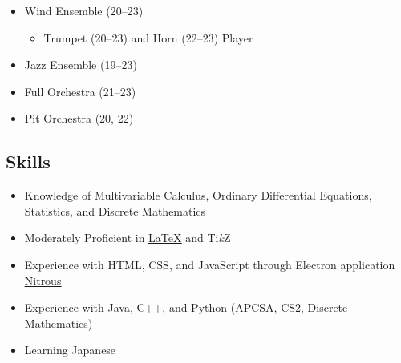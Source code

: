 \documentclass[12pt, twocolumn]{article}
\begin{document}
{\begin{itemize}
\begin{itemize}[leftmargin = 13.5pt]
\begin{itemize}[leftmargin = 13.5pt]
									\end{itemize}
								\item
									Wind Ensemble (20--23)
									\begin{itemize}[leftmargin = 13.5pt]
										\item
											Trumpet (20--23) and Horn (22--23) Player
									\end{itemize}
								\item
									Jazz Ensemble (19--23)
								\item
									Full Orchestra (21--23)
								\item
									Pit Orchestra (20, 22)
							\end{itemize}
					\end{itemize}
			\subsection*{Skills}
				\begin{itemize}
					\item
						Knowledge of Multivariable Calculus, Ordinary Differential Equations, Statistics, and Discrete Mathematics
					\item
						Moderately Proficient in \href{https://github.com/Endolite/TeX}{\underline{\LaTeX}} and Ti\textit{k}Z
					\item
						Experience with HTML, CSS, and JavaScript through Electron application \href{https://github.com/Endolite/Nitrous}{\underline{Nitrous}}
					\item
						Experience with Java, C++, and Python (APCSA, CS2, Discrete Mathematics)
					\item
						Learning Japanese
				\end{itemize}
}
\end{document}

